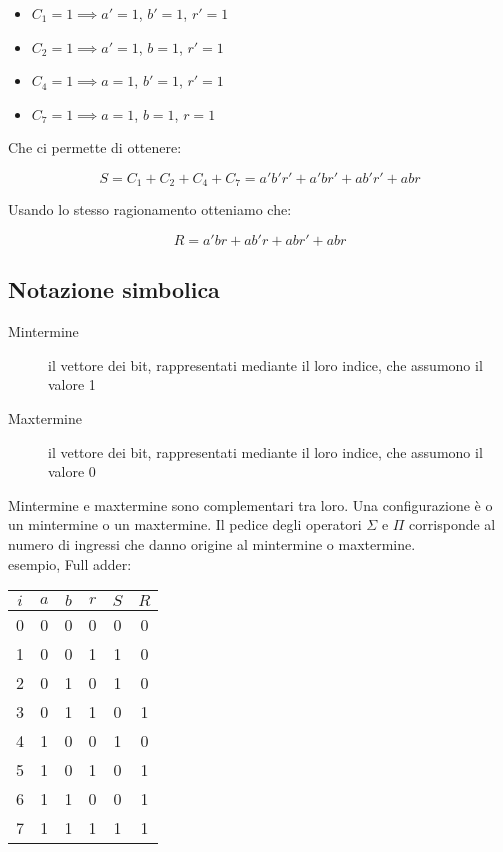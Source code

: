 \documentclass{article}
\begin{document}
\begin{itemize}
\item $C_1 = 1 \implies a' = 1$, $b' = 1$, $r' = 1$
\item $C_2 = 1 \implies a' = 1$, $b = 1$, $r' = 1$
\item $C_4 = 1 \implies a = 1$, $b' = 1$, $r' = 1$
\item $C_7 = 1 \implies a = 1$, $b = 1$, $r = 1$
\end{itemize}

\noindent
Che ci permette di ottenere:

$$
S = C_1 + C_2 + C_4 + C_7 = a'b'r' + a'br' + ab'r' + abr
$$

\noindent
Usando lo stesso ragionamento otteniamo che:

$$
R = a'br + ab'r + abr' + abr
$$

\subsection{Notazione simbolica}

\begin{description}
	\item[Mintermine] il vettore dei bit, rappresentati mediante il loro indice, che assumono il valore 1
	\item[Maxtermine] il vettore dei bit, rappresentati mediante il loro indice, che assumono il valore 0
\end{description}

\noindent
Mintermine e maxtermine sono complementari tra loro.
Una configurazione è o un mintermine o un maxtermine.
Il pedice degli operatori $\Sigma$ e $\Pi$ corrisponde al numero di ingressi che danno origine al mintermine o maxtermine.\\

\noindent
esempio, Full adder:

\begin{center}
\begin{tabular}{ |c|c|c|c|c|c| }
\hline
$i$ & $a$ & $b$ & $r$ & $S$ & $R$ \\
\hline
\hline
0 & 0 & 0 & 0 & 0 & 0 \\
1 & 0 & 0 & 1 & 1 & 0 \\
2 & 0 & 1 & 0 & 1 & 0 \\
3 & 0 & 1 & 1 & 0 & 1 \\
4 & 1 & 0 & 0 & 1 & 0 \\
5 & 1 & 0 & 1 & 0 & 1 \\
6 & 1 & 1 & 0 & 0 & 1 \\
7 & 1 & 1 & 1 & 1 & 1 \\
\hline
\end{tabular}
\end{center}
\end{document}
